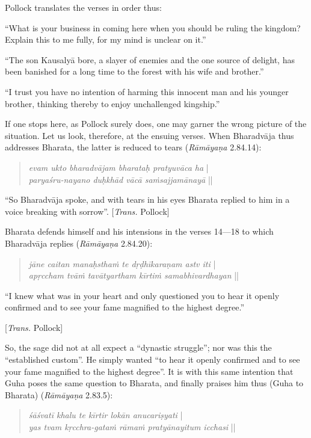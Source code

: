 Pollock translates the verses in order thus:

\begin{myquote}
“What is your business in coming here when you should be ruling the kingdom? Explain this to me fully, for my mind is unclear on it.” 

“The son Kausalyā bore, a slayer of enemies and the one source of delight, has been banished for a long time to the forest with his wife and brother.”			 

“I trust you have no intention of harming this innocent man and his younger brother, thinking thereby to enjoy unchallenged kingship.”
\end{myquote}

If one stops here, as Pollock surely does, one may garner the wrong picture of the situation. Let us look, therefore, at the ensuing verses. When Bharadvāja thus addresses Bharata, the latter is reduced to tears ({\sl Rāmāyaṇa} 2.84.14):
\begin{quote}
{{\sl evam ukto bharadvājam bharataḥ pratyuvāca ha}} |\\
{\sl paryaśru-nayano duḥkhād vācā saṁsajjamānayā} || 
\end{quote}

\begin{myquote}
“So Bharadvāja spoke, and with tears in his eyes Bharata replied to him in a voice breaking with sorrow”. [{\sl Trans.} Pollock]  
\end{myquote}

Bharata defends himself and his intensions in the verses 14---18 to which Bharadvāja replies ({\sl Rāmāyaṇa} 2.84.20):

\newpage

\begin{quote}
{{\sl jāne caitan manaḥsthaṁ te dṛḍhīkaraṇam astv iti}} |\\
{\sl apṛccham tvāṁ tavātyartham kīrtiṁ samabhivardhayan} || 
\end{quote}

\begin{myquote}
“I knew what was in your heart and only questioned you to hear it openly confirmed and to see your fame magnified to the highest degree.” 

\hfill[{\sl Trans.} Pollock]
\end{myquote}

So, the sage did not at all expect a “dynastic struggle”; nor was this the “established custom”. He simply wanted “to hear it openly confirmed and to see your fame magnified to the highest degree”. It is with this same intention that Guha poses the same question to Bharata, and finally praises him thus (Guha to Bharata) ({\sl Rāmāyaṇa} 2.83.5): 
\begin{quote}
{{\sl śāśvatī khalu te kīrtir lokān anucariṣyati}} |\\
{\sl yas tvam kṛcchra-gataṁ rāmaṁ pratyānayitum icchasi} || 
\end{quote}

